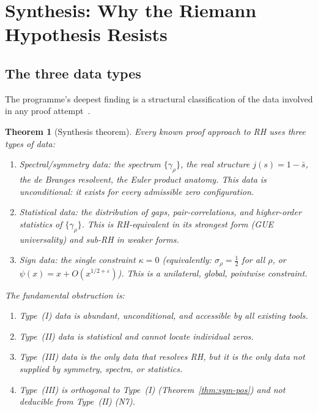\documentclass[11pt]{amsart}
\newtheorem{theorem}{Theorem}[section]
\theoremstyle{definition}
\theoremstyle{remark}
\newcommand{\half}{\tfrac{1}{2}}
\newcommand{\kap}{\kappa}
\newcommand{\sig}{\sigma}
\newcommand{\gam}{\gamma}
\newcommand{\eps}{\varepsilon}
\begin{document}
\section{Synthesis: Why the Riemann Hypothesis Resists}
\label{sec:synthesis}

\subsection{The three data types}

The programme's deepest finding is a structural classification of the data involved
in any proof attempt~\cite{RP25}.

\begin{theorem}[Synthesis theorem]
\label{thm:synthesis}
Every known proof approach to RH uses three types of data:
\begin{enumerate}[label=\upshape(\Roman*)]
  \item \emph{Spectral/symmetry data}: the spectrum $\{\gam_\rho\}$, the real
    structure $j(s)=1-\bar s$, the de Branges resolvent, the Euler product anatomy.
    This data is \emph{unconditional}: it exists for every admissible zero
    configuration.
  \item \emph{Statistical data}: the distribution of gaps, pair-correlations,
    and higher-order statistics of $\{\gam_\rho\}$.  This is RH-equivalent in
    its strongest form (GUE universality) and sub-RH in weaker forms.
  \item \emph{Sign data}: the single constraint $\kap=0$ (equivalently:
    $\sig_\rho=\half$ for all $\rho$, or $\psi(x)=x+O(x^{1/2+\eps})$).  This is
    a unilateral, global, pointwise constraint.
\end{enumerate}
The fundamental obstruction is:
\begin{enumerate}[label=\upshape(\alph*)]
  \item Type~(I) data is abundant, unconditional, and accessible by all existing tools.
  \item Type~(II) data is statistical and cannot locate individual zeros.
  \item Type~(III) data is the only data that resolves RH, but it is the only data
    not supplied by symmetry, spectra, or statistics.
  \item Type~(III) is \emph{orthogonal} to Type~(I) (Theorem~\ref{thm:sym-pos})
    and not deducible from Type~(II) (N7).
\end{enumerate}
\end{theorem}
\end{document}

